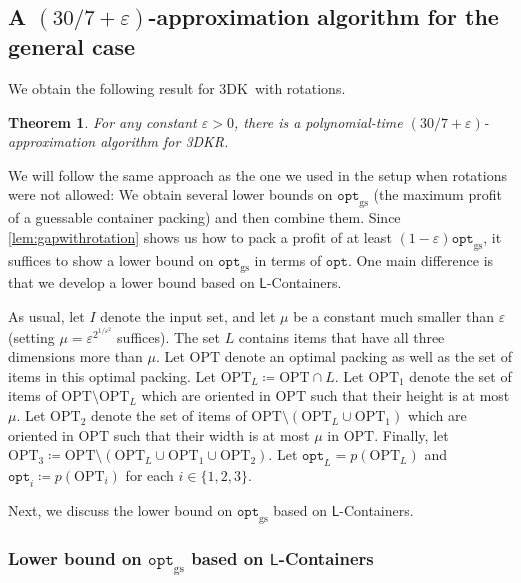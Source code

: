\documentclass[10pt,a4paper]{amsart}
\newcommand{\deb}[1]{#1}
\newcommand{\kvnr}[1]{}
\newcommand{\eps}{\varepsilon}
\newcommand{\tdk}{\textsc{3DK}}
\newcommand{\tdkr}{\textsc{3DKR}}
\newtheorem{theorem}{Theorem}[section]
\theoremstyle{definition}
\newcommand{\opt}{\mathtt{opt}}
\newcommand{\optgs}{\mathtt{opt}_{\mathrm{gs}}}
\newcommand{\LContainers}{$\mathsf{L}$-Containers}
\newcommand{\OPT}{\mathrm{OPT}}
\begin{document}
\subsection{A \texorpdfstring{$(30/7+\eps)$}{(30/7 + ε)}-approximation algorithm for the general case}
\label{sec:rot-general-case}
We obtain the following result for \tdk~with rotations. 
\begin{theorem}
    \label{thm:3dkrot}
   For any constant $\eps>0$, there is a polynomial-time $(30/7+\eps)$-approximation algorithm for \tdkr. 
\end{theorem}

We will follow the same approach as the one we used in the setup when rotations were not allowed:
We obtain several lower bounds on $\optgs$ (the maximum profit of a guessable container packing) and then combine them.
Since \cref{lem:gapwithrotation} shows us how to pack a profit of at least $(1-\eps)\optgs$, it suffices to show a lower bound on $\optgs$ in terms of $\opt$.
One main difference is that we develop a lower bound based on \LContainers. 

As usual, let $I$ denote the input set, and let $\mu$ be a constant much smaller than $\eps$ (setting $\mu=\eps^{2^{1/\eps^2}}$ suffices).
The set $L$ contains items that have all three dimensions more than $\mu$.
Let $\OPT$ denote an optimal packing as well as the set of items in this optimal packing. 
Let $\OPT_L\coloneqq \OPT\cap L$.
Let $\OPT_1$ denote the set of items of $\OPT\setminus \OPT_L$ which are oriented in $\OPT$
such that their height is at most $\mu$. Let $\OPT_2$ denote the set of items of $\OPT\setminus (\OPT_L\cup\OPT_1)$ which are oriented in $\OPT$
such that their width is at most $\mu$ in $\OPT$. Finally, let $\OPT_3\coloneqq\OPT\setminus(\OPT_L\cup\OPT_1\cup\OPT_2)$.
Let $\opt_L=p(\OPT_L)$ and $\opt_i\coloneqq p(\OPT_i)$ for each $i\in\{1,2,3\}$.

Next, we discuss the lower bound on $\optgs$ based on \LContainers{}.
\subsubsection{Lower bound on \texorpdfstring{$\optgs$}{optgs} based on \texorpdfstring{\LContainers}{L-Containers}}
\label{sec:7by24guarantee}
\end{document}
